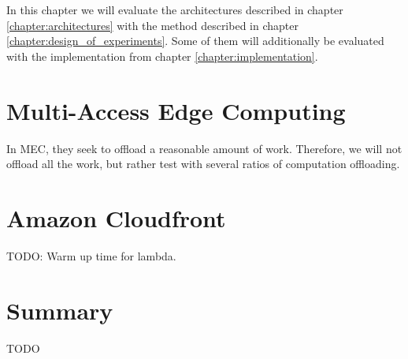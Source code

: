 In this chapter we will evaluate the architectures described in chapter \ref{chapter:architectures} with the method described in chapter \ref{chapter:design_of_experiments}. Some of them will additionally be evaluated with the implementation from chapter \ref{chapter:implementation}.



\section{Multi-Access Edge Computing}
In MEC, they seek to offload a reasonable amount of work. Therefore, we will not offload all the work, but rather test with several ratios of computation offloading.





\section{Amazon Cloudfront}
TODO: Warm up time for lambda.
\section{Summary}
TODO